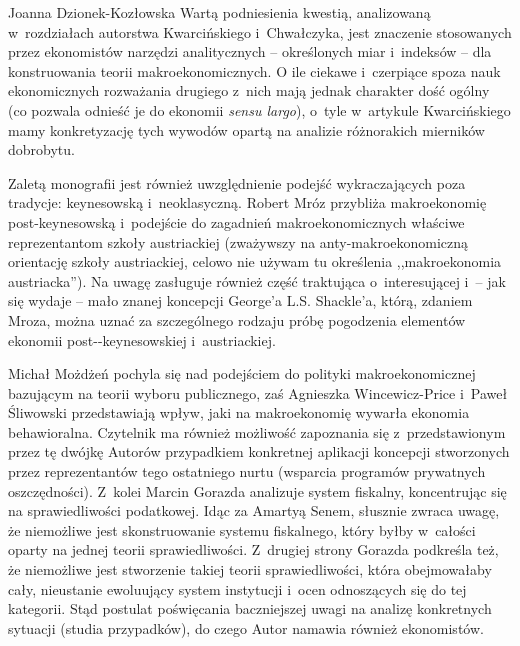 \begin{recplenv}{Joanna Dzionek-Kozłowska}
Wartą podniesienia kwestią, analizowaną w~rozdziałach autorstwa Kwarcińskiego i~Chwałczyka, jest znaczenie stosowanych
przez ekonomistów narzędzi analitycznych -- określonych miar i~indeksów -- dla konstruowania teorii makroekonomicznych.
O ile ciekawe i~czerpiące spoza nauk ekonomicznych rozważania drugiego z~nich mają jednak charakter dość ogólny (co
pozwala odnieść je do ekonomii \textit{sensu largo}), o~tyle w~artykule Kwarcińskiego mamy konkretyzację tych wywodów
opartą na analizie różnorakich mierników dobrobytu. 

Zaletą monografii jest również uwzględnienie podejść wykraczających poza tradycje: keynesowską i~neoklasyczną. Robert
Mróz przybliża makroekonomię post-keynesowską i~podejście do zagadnień makroekonomicznych właściwe reprezentantom
szkoły austriackiej (zważywszy na anty-makroekonomiczną orientację szkoły austriackiej, celowo nie używam tu określenia
,,makroekonomia austriacka''). Na uwagę zasługuje również część traktująca o~interesującej i~-- jak się
wydaje -- mało znanej koncepcji George'a L.S. Shackle'a, którą, zdaniem Mroza, można uznać za szczególnego rodzaju próbę pogodzenia
elementów ekonomii post-\mbox{-keynesowskiej} i~austriackiej.

Michał Możdżeń pochyla się nad podejściem do polityki makroekonomicznej bazującym na teorii wyboru publicznego, zaś
Agnieszka Wincewicz-Price i~Paweł Śliwowski przedstawiają wpływ, jaki na makroekonomię wywarła ekonomia behawioralna.
Czytelnik ma również możliwość zapoznania się z~przedstawionym przez tę dwójkę Autorów przypadkiem konkretnej aplikacji koncepcji
stworzonych przez reprezentantów tego ostatniego nurtu (wsparcia programów prywatnych oszczędności). Z~kolei Marcin
Gorazda analizuje system fiskalny, koncentrując się na sprawiedliwości podatkowej. Idąc za Amartyą Senem, słusznie
zwraca uwagę, że niemożliwe jest skonstruowanie systemu fiskalnego, który byłby w~całości oparty na jednej teorii
sprawiedliwości. Z~drugiej strony Gorazda podkreśla też, że niemożliwe jest stworzenie takiej teorii sprawiedliwości,
która obejmowałaby cały, nieustanie ewoluujący system instytucji i~ocen odnoszących się do tej kategorii. Stąd postulat
poświęcania baczniejszej uwagi na analizę konkretnych sytuacji (studia przypadków), do czego Autor namawia również ekonomistów.


\end{recplenv}
